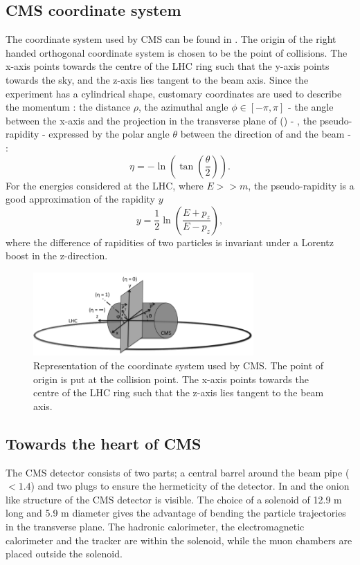 \subsection{CMS coordinate system}
The coordinate system used by CMS can be found in . The origin of the right handed orthogonal coordinate system is chosen to be the point of collisions. The x-axis points towards the centre of the LHC ring such that the y-axis points towards the sky, and the z-axis lies tangent to the beam axis. Since the experiment has a cylindrical shape, customary coordinates are used to describe the momentum \impuls: the distance $\rho$, the azimuthal angle $\phi \in \left[-\pi,\pi\right]$ - the angle between the x-axis and the projection in the transverse plane of \impuls (\trimpuls) - , the pseudo-rapidity \psrap - expressed by the polar angle $\theta$ between the direction of \impuls and the beam - : 
\begin{equation}
\eta = - \ln \left(\tan \left(\frac{\theta}{2}\right)\right).
\end{equation}
For the energies considered at the LHC, where $E >> m$, the pseudo-rapidity is a good approximation of the rapidity $y$
\begin{equation}
y = \frac{1}{2} \ln \left(\frac{E + p_z}{E - p_z}\right), 
\end{equation}
where the difference of rapidities of two particles is invariant under a Lorentz boost in the z-direction.
 \begin{figure}[ht]
	\centering
	\includegraphics[width=0.75\textwidth]{2_ExperimentalSetup/Figures/imageedit_1_9146672677}
	\caption{Representation of the coordinate system used by CMS. The point of origin is put at the collision point. The x-axis points towards the centre of the LHC ring such that the z-axis lies tangent to the beam axis. }
	\label{fig:CMScoord}
\end{figure}

\subsection{Towards the heart of CMS}
The CMS detector consists of two parts; a central barrel around the beam pipe (\abspsrap $<1.4$) and two plugs to ensure the hermeticity of the detector. In  and  the onion like structure of the CMS detector is visible. The choice of a solenoid of 12.9 \si{ \meter}  long and 5.9 \si{ \meter}
diameter gives the advantage of bending the particle trajectories in the transverse plane. The hadronic calorimeter,  the electromagnetic calorimeter and the tracker are within the solenoid, while the muon chambers are placed outside the solenoid.



